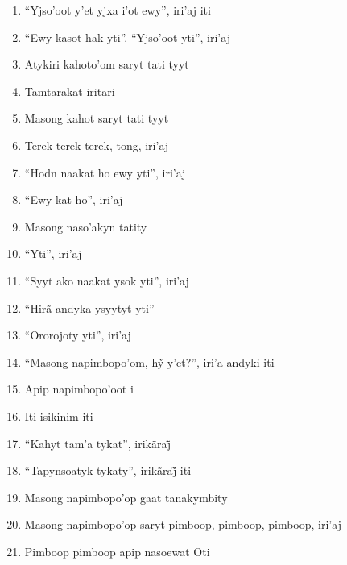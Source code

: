 \begin{enumerate}
 \item ``Yjso'oot y'et yjxa i'ot ewy'', iri'aj iti

 \item ``Ewy kasot hak yti''.  ``Yjso'oot yti'', iri'aj

 \item Atykiri kahoto'om saryt tati tyyt

 \item Tamtarakat iritari

 \item Masong kahot saryt tati tyyt

 \item Terek terek terek, tong, iri'aj

 \item ``Hodn naakat ho ewy yti'', iri'aj

 \item ``Ewy kat ho'', iri'aj

 \item Masong naso'akyn tatity

 \begin{center}\end{center}

 \item ``Yti'', iri'aj

 \item ``Syyt ako naakat ysok yti'', iri'aj

 \item ``Hirã andyka ysyytyt yti''

 \item ``Ororojoty yti'', iri'aj

 \item ``Masong napimbopo’om, hỹ y’et?'', iri’a andyki iti

 \item Apip napimbopo'oot i

 \item Iti isikinim iti

 \item ``Kahyt tam’a tykat'', irikãraj̃

 \item ``Tapynsoatyk tykaty'', irikãraj̃ iti

 \item Masong napimbopo'op gaat tanakymbity

 \item Masong napimbopo'op saryt pimboop, pimboop, pimboop, iri'aj

 \item Pimboop pimboop apip nasoewat Oti


\end{enumerate}
